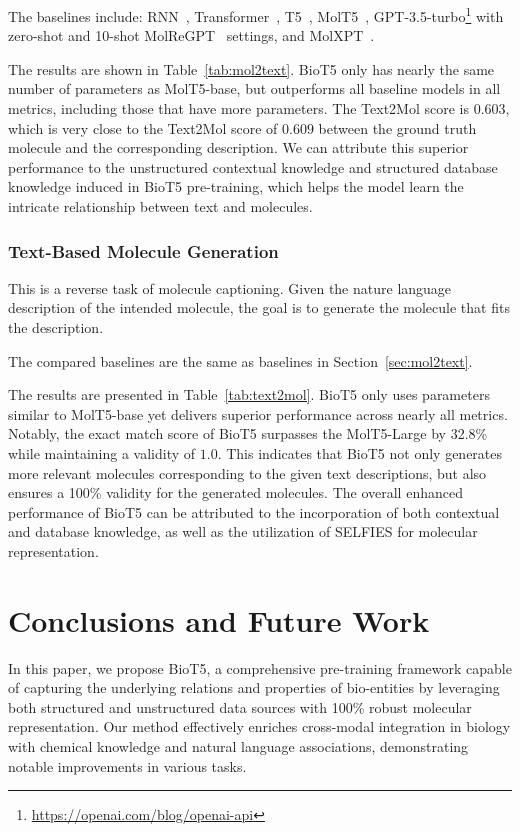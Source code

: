\documentclass[11pt]{article}
\newcommand{\method}{{BioT5}}
\begin{document}
The baselines include:
RNN~\citep{medsker2001recurrent}, Transformer~\citep{vaswani2017attention}, T5~\citep{raffel2020exploring}, MolT5~\citep{DBLP:conf/emnlp/EdwardsLRHCJ22}, GPT-3.5-turbo\footnote{\url{https://openai.com/blog/openai-api}} with zero-shot and 10-shot MolReGPT~\citep{li2023empowering} settings, and MolXPT~\cite{liu2023molxpt}.

The results are shown in Table~\ref{tab:mol2text}.
\method{} only has nearly the same number of parameters as MolT5-base, but outperforms all baseline models in all metrics, including those that have more parameters.
The Text2Mol score is $0.603$, which is very close to the Text2Mol score of $0.609$ between the ground truth molecule and the corresponding description.
We can attribute this superior performance to the unstructured contextual knowledge and structured database knowledge induced in \method{} pre-training, which helps the model learn the intricate relationship between text and molecules. 

\subsubsection{Text-Based Molecule Generation}
\label{sec:text2mol}
This is a reverse task of molecule captioning.
Given the nature language description of the intended molecule, the goal is to generate the molecule that fits the description.

The compared baselines are the same as baselines in Section~\ref{sec:mol2text}.

The results are presented in Table~\ref{tab:text2mol}.
\method{} only uses parameters similar to MolT5-base yet delivers superior performance across nearly all metrics.
Notably, the exact match score of \method{} surpasses the MolT5-Large by 32.8\% while maintaining a validity of $1.0$.
This indicates that \method{} not only generates more relevant molecules corresponding to the given text descriptions, but also ensures a 100\% validity for the generated molecules.
The overall enhanced performance of \method{} can be attributed to the incorporation of both contextual and database knowledge, as well as the utilization of SELFIES for molecular representation.

\section{Conclusions and Future Work}
In this paper, we propose \method{}, a comprehensive pre-training framework capable of capturing the underlying relations and properties of bio-entities by leveraging both structured and unstructured data sources with 100\% robust molecular representation. 
Our method effectively enriches cross-modal integration in biology with chemical knowledge and natural language associations, demonstrating notable improvements in various tasks.
\end{document}
